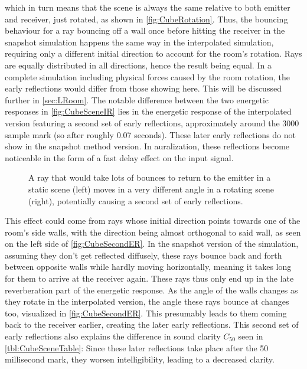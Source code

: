 which in turn means that the scene is always the same relative to both emitter and receiver, just rotated,
as shown in \autoref{fig:CubeRotation}.
\newline
Thus, the bouncing behaviour for a ray bouncing off a wall once before hitting the receiver
in the snapshot simulation happens the same way in the interpolated simulation,
requiring only a different initial direction to account for the room's rotation.
Rays are equally distributed in all directions, hence the result being equal.
\newline
In a complete simulation including physical forces caused by the room rotation,
the early reflections would differ from those showing here.
This will be discussed further in \autoref{sec:LRoom}.
\newline
The notable difference between the two energetic responses in \autoref{fig:CubeSceneIR}
lies in the energetic response of the interpolated version featuring a second set of early reflections,
approximately around the 3000 sample mark (so after roughly 0.07 seconds).
These later early reflections do not show in the snapshot method version.
In auralization, these reflections become noticeable in the form of a fast delay effect on the input signal.
\newline
\begin{figure}[t!]
    \begin{center}
        
    \end{center}
    \caption{A ray that would take lots of bounces to return to the emitter in a static scene (left) moves in a very different angle in a rotating scene (right), potentially causing a second set of early reflections.}\label{fig:CubeSecondER}
\end{figure}
This effect could come from rays whose initial direction points towards one of the room's side walls,
with the direction being almost orthogonal to said wall, as seen on the left side of \autoref{fig:CubeSecondER}.
In the snapshot version of the simulation, assuming they don't get reflected diffusely,
these rays bounce back and forth between opposite walls while hardly moving horizontally,
meaning it takes long for them to arrive at the receiver again.
These rays thus only end up in the late reverberation part of the energetic response.
\newline
As the angle of the walls changes as they rotate in the interpolated version,
the angle these rays bounce at changes too, visualized in \autoref{fig:CubeSecondER}.
This presumably leads to them coming back to the receiver earlier, creating the later early reflections.
\newline
This second set of early reflections also explains the difference in sound clarity \(C_{50}\) seen in \autoref{tbl:CubeSceneTable}:
Since these later reflections take place after the 50 millisecond mark,
they worsen intelligibility, leading to a decreased clarity.

